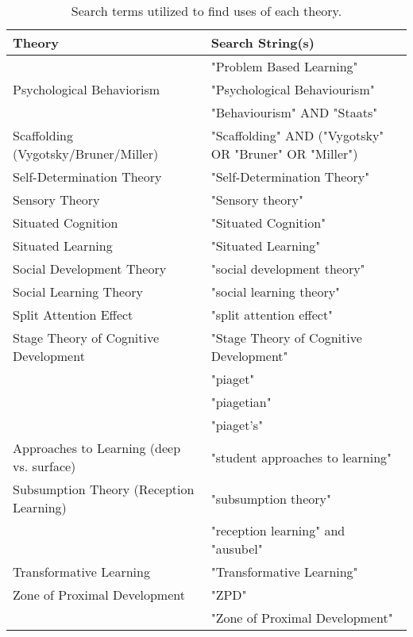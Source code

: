 \begin{table*}[t]
\begin{tabular}{ll}
Theory & Search String(s)\\\hline
 & "Problem Based Learning"\\
Psychological Behaviorism & "Psychological Behaviourism"\\
 & "Behaviourism" AND "Staats"\\
Scaffolding (Vygotsky/Bruner/Miller) & "Scaffolding" AND ("Vygotsky" OR "Bruner" OR "Miller")\\
Self-Determination Theory & "Self-Determination Theory"\\
Sensory Theory & "Sensory theory"\\
Situated Cognition & "Situated Cognition"\\
Situated Learning & "Situated Learning"\\
Social Development Theory & "social development theory"\\
Social Learning Theory & "social learning theory"\\
Split Attention Effect & "split attention effect"\\
Stage Theory of Cognitive Development & "Stage Theory of Cognitive Development"\\
 & "piaget"\\
 & "piagetian"\\
 & "piaget's"\\
Approaches to Learning (deep vs. surface) & "student approaches to learning"\\
Subsumption Theory (Reception Learning) & "subsumption theory"\\
 & "reception learning" and "ausubel"\\
Transformative Learning & "Transformative Learning"\\
Zone of Proximal Development & "ZPD"\\
 & "Zone of Proximal Development"
\end{tabular}
\caption{Search terms utilized to find uses of each theory.}
\end{table*}